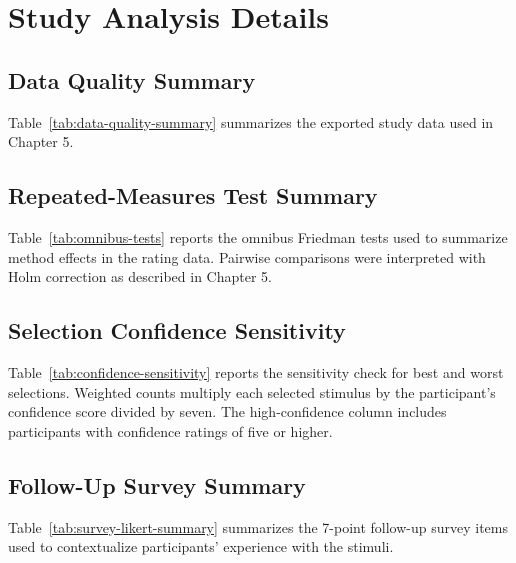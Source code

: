 \chapter{Study Analysis Details}
\label{app:study-analysis}

\section{Data Quality Summary}
Table~\ref{tab:data-quality-summary} summarizes the exported study data used in Chapter 5.



\section{Repeated-Measures Test Summary}
Table~\ref{tab:omnibus-tests} reports the omnibus Friedman tests used to summarize method effects in the rating data. Pairwise comparisons were interpreted with Holm correction as described in Chapter 5.



\section{Selection Confidence Sensitivity}
Table~\ref{tab:confidence-sensitivity} reports the sensitivity check for best and worst selections. Weighted counts multiply each selected stimulus by the participant's confidence score divided by seven. The high-confidence column includes participants with confidence ratings of five or higher.



\section{Follow-Up Survey Summary}
Table~\ref{tab:survey-likert-summary} summarizes the 7-point follow-up survey items used to contextualize participants' experience with the stimuli.


